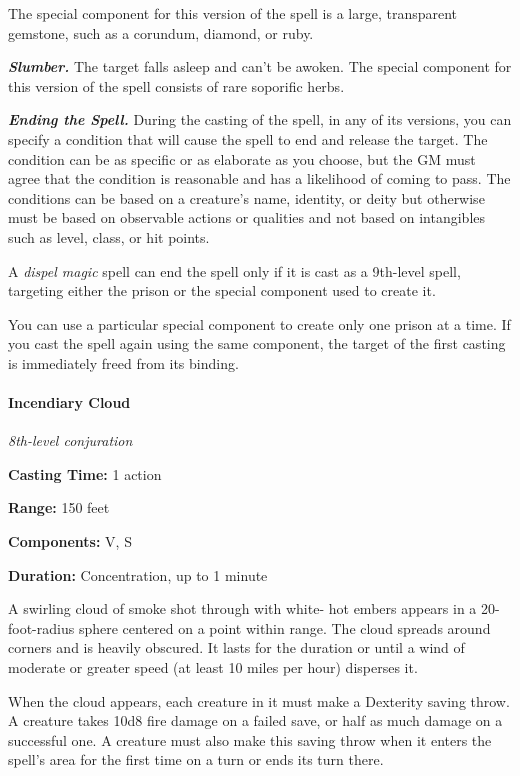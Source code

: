 \documentclass[
]{article}
\begin{document}
The special component for this version of the spell is a large,
transparent gemstone, such as a corundum, diamond, or ruby.

\emph{\textbf{Slumber.}} The target falls asleep and can't be awoken.
The special component for this version of the spell consists of rare
soporific herbs.

\emph{\textbf{Ending the Spell.}} During the casting of the spell, in
any of its versions, you can specify a condition that will cause the
spell to end and release the target. The condition can be as specific or
as elaborate as you choose, but the GM must agree that the condition is
reasonable and has a likelihood of coming to pass. The conditions can be
based on a creature's name, identity, or deity but otherwise must be
based on observable actions or qualities and not based on intangibles
such as level, class, or hit points.

A \emph{dispel magic} spell can end the spell only if it is cast as a
9th-level spell, targeting either the prison or the special component
used to create it.

You can use a particular special component to create only one prison at
a time. If you cast the spell again using the same component, the target
of the first casting is immediately freed from its binding.

\hypertarget{incendiary-cloud}{%
\paragraph{Incendiary Cloud}\label{incendiary-cloud}}

\emph{8th-level conjuration}

\textbf{Casting Time:} 1 action

\textbf{Range:} 150 feet

\textbf{Components:} V, S

\textbf{Duration:} Concentration, up to 1 minute

A swirling cloud of smoke shot through with white- hot embers appears in
a 20-foot-radius sphere centered on a point within range. The cloud
spreads around corners and is heavily obscured. It lasts for the
duration or until a wind of moderate or greater speed (at least 10 miles
per hour) disperses it.

When the cloud appears, each creature in it must make a Dexterity saving
throw. A creature takes 10d8 fire damage on a failed save, or half as
much damage on a successful one. A creature must also make this saving
throw when it enters the spell's area for the first time on a turn or
ends its turn there.
\end{document}
